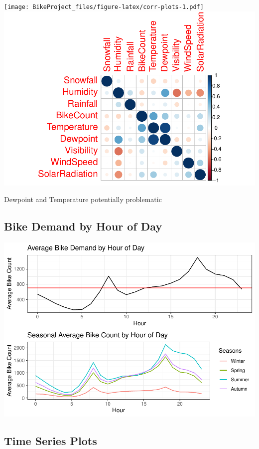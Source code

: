 \documentclass[
]{article}
\begin{document}
\texttt{[image: BikeProject\_files/figure-latex/corr-plots-1.pdf]}
\includegraphics{BikeProject_files/figure-latex/corr-plots-2.pdf}

Dewpoint and Temperature potentially problematic

\newpage

\hypertarget{bike-demand-by-hour-of-day}{%
\subsection{Bike Demand by Hour of
Day}\label{bike-demand-by-hour-of-day}}

\includegraphics{BikeProject_files/figure-latex/demand-by-day-1.pdf}

\hypertarget{time-series-plots}{%
\subsection{Time Series Plots}\label{time-series-plots}}
\end{document}
